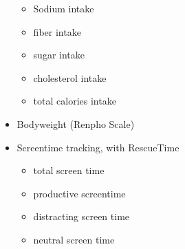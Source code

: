 \documentclass[conference]{IEEEtran}
\begin{document}
\begin{itemize}
\begin{itemize}
\item Sodium intake
\item fiber intake
\item sugar intake
\item cholesterol intake
\item total calories intake
\end{itemize}
\item Bodyweight (Renpho Scale) 
\item Screentime tracking, with RescueTime
   \begin{itemize}
\item total screen time
\item productive screentime
\item distracting screen time
\item neutral screen time
\end{itemize}
\end{itemize}
\end{document}

